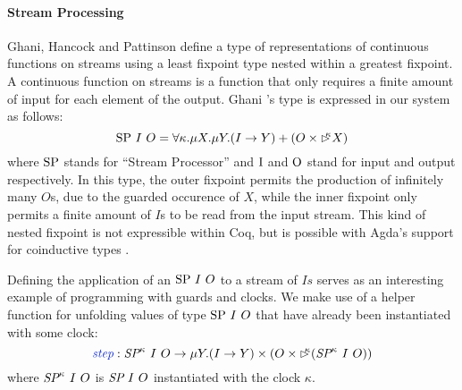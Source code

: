 \paragraph{Stream Processing}

Ghani, Hancock and Pattinson \cite{ghani09representations} define a
type of representations of continuous functions on streams using a
least fixpoint type nested within a greatest fixpoint. A continuous
function on streams is a function that only requires a finite amount
of input for each element of the output. Ghani \etal's type is
expressed in our system as follows:
\begin{displaymath}
  \textrm{SP}~I~O = \forall \kappa. \mu X. \mu Y. (I \to Y) + (O \times \mathord{\rhd\kern-0.4em^{\kappa}} X)
\end{displaymath}
where $\textrm{SP}$ stands for ``Stream Processor'' and $\textrm{I}$
and $\textrm{O}$ stand for input and output respectively. In this
type, the outer fixpoint permits the production of infinitely many
$O$s, due to the guarded occurence of $X$, while the inner fixpoint
only permits a finite amount of $I$s to be read from the input
stream. This kind of nested fixpoint is not expressible within Coq,
but is possible with Agda's support for coinductive types
\cite{danielsson09mixing}.

Defining the application of an $\textrm{SP}~I~O$ to a stream of $Is$
serves as an interesting example of programming with guards and
clocks. We make use of a helper function for unfolding values of type
$\textrm{SP}~I~O$ that have already been instantiated with some clock:
\begin{displaymath}
  \defn{step} : \ident{SP}^\kappa~I~O \to \mu Y. (I \to Y) \times (O \times \delay\kappa(\ident{SP}^\kappa~I~O))
\end{displaymath}
where $\textit{SP}^\kappa~I~O$ is $\textit{SP}~I~O$ instantiated with
the clock $\kappa$.

